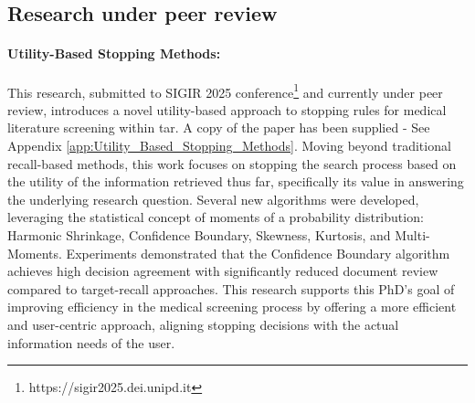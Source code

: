 \documentclass[10pt,oneside]{book}
\begin{document}
\subsection{Research under peer review}

\paragraph{Utility-Based Stopping Methods: } This research, submitted to SIGIR 2025 conference\footnote{https://sigir2025.dei.unipd.it} and currently under peer review, introduces a novel utility-based approach to stopping rules for medical literature screening within \gls*{tar}. A copy of the paper has been supplied - See Appendix \ref{app:Utility_Based_Stopping_Methods}. Moving beyond traditional recall-based methods, this work focuses on stopping the search process based on the utility of the information retrieved thus far, specifically its value in answering the underlying research question. Several new algorithms were developed, leveraging the statistical concept of moments of a probability distribution: Harmonic Shrinkage, Confidence Boundary, Skewness, Kurtosis, and Multi-Moments. Experiments demonstrated that the Confidence Boundary algorithm achieves high decision agreement with significantly reduced document review compared to target-recall approaches. This research supports this PhD's goal of improving efficiency in the medical screening process by offering a more efficient and user-centric approach, aligning stopping decisions with the actual information needs of the user.
\end{document}

